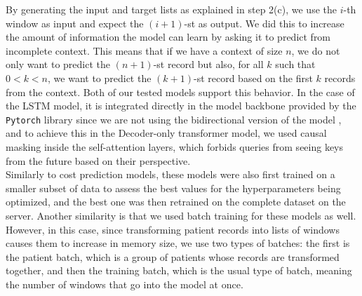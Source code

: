 By generating the input and target lists as explained in step 2(c), we use the $i$-th window as input and expect the $(i+1)$-st as output. We did this to increase the amount of information the model can learn by asking it to predict from incomplete context. This means that if we have a context of size $n$, we do not only want to predict the $(n+1)$-st record but also, for all $k$ such that $0<k<n$, we want to predict the $(k+1)$-st record based on the first $k$ records from the context. Both of our tested models support this behavior. In the case of the LSTM model, it is integrated directly in the model backbone provided by the \texttt{Pytorch} library since we are not using the bidirectional version of the model \cite{pytorchLSTM}, and to achieve this in the Decoder-only transformer model, we used causal masking inside the self-attention layers, which forbids queries from seeing keys from the future based on their perspective.
\\

Similarly to cost prediction models, these models were also first trained on a smaller subset of data to assess the best values for the hyperparameters being optimized, and the best one was then retrained on the complete dataset on the server. Another similarity is that we used batch training for these models as well. However, in this case, since transforming patient records into lists of windows causes them to increase in memory size, we use two types of batches: the first is the patient batch, which is a group of patients whose records are transformed together, and then the training batch, which is the usual type of batch, meaning the number of windows that go into the model at once.